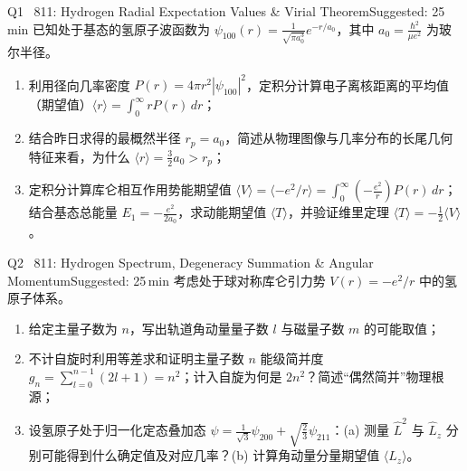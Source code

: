 \documentclass[a4paper,11pt]{article}
\begin{document}
\vspace{2pt}

\begin{problem}{Q1 \textbar\ 811: Hydrogen Radial Expectation Values \& Virial Theorem}{Suggested: 25\,min}
已知处于基态的氢原子波函数为 $\psi_{100}(r) = \frac{1}{\sqrt{\pi a_0^3}} e^{-r/a_0}$，其中 $a_0 = \frac{\hbar^2}{\mu e^2}$ 为玻尔半径。
\begin{enumerate}[leftmargin=1.5em,itemsep=0.5pt,topsep=1pt]
  \item 利用径向几率密度 $P(r) = 4\pi r^2 |\psi_{100}|^2$，定积分计算电子离核距离的平均值（期望值）$\langle r \rangle = \int_0^\infty r P(r)\,dr$；
  \item 结合昨日求得的最概然半径 $r_p = a_0$，简述从物理图像与几率分布的长尾几何特征来看，为什么 $\langle r \rangle = \frac{3}{2}a_0 > r_p$；
  \item 定积分计算库仑相互作用势能期望值 $\langle V \rangle = \langle -e^2/r \rangle = \int_0^\infty (-\frac{e^2}{r}) P(r)\,dr$；结合基态总能量 $E_1 = -\frac{e^2}{2a_0}$，求动能期望值 $\langle T \rangle$，并验证维里定理 $\langle T \rangle = -\frac{1}{2}\langle V \rangle$。
\end{enumerate}
\end{problem}

\vspace{2pt}

\begin{problem}{Q2 \textbar\ 811: Hydrogen Spectrum, Degeneracy Summation \& Angular Momentum}{Suggested: 25\,min}
考虑处于球对称库仑引力势 $V(r) = -e^2/r$ 中的氢原子体系。
\begin{enumerate}[leftmargin=1.5em,itemsep=0.5pt,topsep=1pt]
  \item 给定主量子数为 $n$，写出轨道角动量量子数 $l$ 与磁量子数 $m$ 的可能取值；
  \item 不计自旋时利用等差求和证明主量子数 $n$ 能级简并度 $g_n = \sum_{l=0}^{n-1} (2l+1) = n^2$；计入自旋为何是 $2n^2$？简述“偶然简并”物理根源；
  \item 设氢原子处于归一化定态叠加态 $\psi = \frac{1}{\sqrt{3}}\psi_{200} + \sqrt{\frac{2}{3}}\psi_{211}$：(a) 测量 $\hat{L}^2$ 与 $\hat{L}_z$ 分别可能得到什么确定值及对应几率？(b) 计算角动量分量期望值 $\langle L_z \rangle$。
\end{enumerate}
\end{problem}

\clearpage
\end{document}
